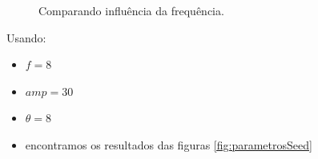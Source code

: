 \begin{figure}[H]
     \centering
     \hspace{0.1cm}
     \hspace{0.1cm}
     \caption{Comparando influência da frequência.}
     \label{fig:parametrosfreq}
\end{figure}

Usando:
\begin{itemize}
    \item $f = 8$
    \item $amp = 30$
    \item $\theta = 8$
    \item encontramos os resultados das figuras \ref{fig:parametrosSeed}
\end{itemize}

